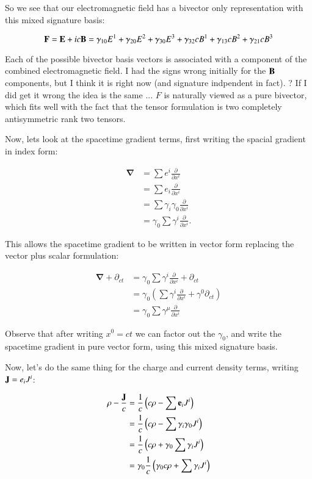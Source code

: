 \documentclass{article}
\newcommand{\spacegrad}[0]{\boldsymbol{\nabla}}
\begin{document}
So we see that our electromagnetic field has a bivector only representation with this mixed signature basis:

\begin{equation}
\mathbf{F} = \mathbf{E} + ic\mathbf{B} = \gamma_{10} E^1 +\gamma_{20} E^2 +\gamma_{30} E^3 +\gamma_{32} c B^1 +\gamma_{13} c B^2 +\gamma_{21} c B^3 
\end{equation}

Each of the possible bivector basis vectors is associated with a component of the combined electromagnetic field.
I had the signs wrong initially for the $\mathbf{B}$ components, but I think it is right now (and signature indpendent in fact).  ?  If I did get it wrong the idea is the same ... $F$ is naturally
viewed as a pure bivector, which fits well with the fact that the tensor formulation is two completely antisymmetric rank two tensors.

Now, lets look at the spacetime gradient terms, first writing the spacial gradient in index form:

\begin{align*}
\spacegrad 
&= \sum e^i \frac{\partial}{\partial x^i} \\
&= \sum e_i \frac{\partial}{\partial x^i} \\
&= \sum \gamma_i \gamma_0 \frac{\partial}{\partial x^i} \\
&= \gamma_0 \sum \gamma^i \frac{\partial}{\partial x^i}.
\end{align*}

This allows the spacetime gradient to be written in vector form replacing the vector plus scalar formulation:

\begin{align*}
\spacegrad + \partial_{ct}
&= \gamma_0 \sum \gamma^i \frac{\partial}{\partial x^i} + \partial_{ct} \\
&= \gamma_0 \left(\sum \gamma^i \frac{\partial}{\partial x^i} + \gamma^0 \partial_{ct} \right) \\
&= \gamma_0 \sum \gamma^{\mu} \frac{\partial}{\partial x^i} 
\end{align*}

Observe that after writing $x^0 = ct$ we can factor out the $\gamma_0$, and write the spacetime gradient in pure vector form, using this mixed signature basis.

Now, let's do the same thing for the charge and current density terms, writing $\mathbf{J} = e_i J^i$:

\begin{align*}
\rho - \frac{\mathbf{J}}{c}
&= \frac{1}{c} \left( c\rho - \sum \mathbf{e}_i J^i \right) \\
&= \frac{1}{c} \left( c\rho - \sum \gamma_i \gamma_0 J^i \right) \\
&= \frac{1}{c} \left( c\rho + \gamma_0 \sum \gamma_i J^i \right) \\
&= \gamma_0 \frac{1}{c} \left( \gamma_0 c \rho + \sum \gamma_i J^i \right) \\
\end{align*}
\end{document}
